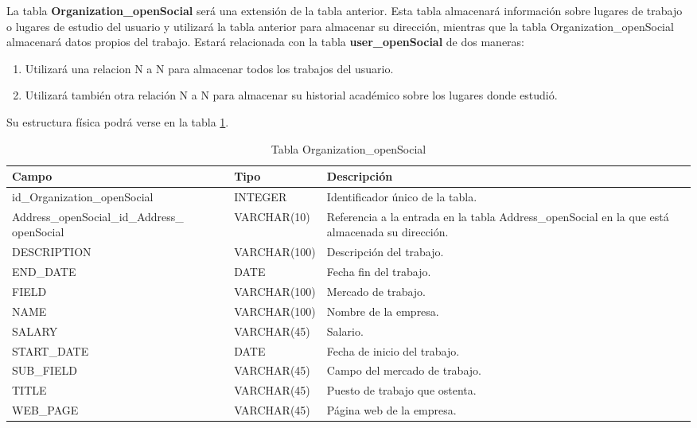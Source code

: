 \bigskip
\par
La tabla \textbf{Organization\_openSocial} será una extensión de la tabla anterior. Esta tabla almacenará información sobre lugares de trabajo o lugares de estudio del usuario y utilizará la tabla anterior para almacenar su dirección, mientras que la tabla Organization\_openSocial almacenará datos propios del trabajo. Estará relacionada con la tabla \textbf{user\_openSocial} de dos maneras:
\begin{enumerate}
\item Utilizará una relacion N a N para almacenar todos los trabajos del usuario.
\item Utilizará también otra relación N a N para almacenar su historial académico sobre los lugares donde estudió.
\end{enumerate}
\bigskip
\par
Su estructura física podrá verse en la tabla \ref{tabOrganizationOpenSocial}.
\bigskip
\par
\begin{table}[h]
\begin{center}
\begin{tabular}{| p{65mm} | l | p{60mm} |}\hline
\textbf{Campo}&\textbf{Tipo}&\textbf{Descripción} \\ \hline
id\_Organization\_openSocial & INTEGER & Identificador único de la tabla. \\ \hline
Address\_openSocial\_id\_Address\_ openSocial & VARCHAR(10) & Referencia a la entrada en la tabla Address\_openSocial en la que está almacenada su dirección. \\ \hline
DESCRIPTION & VARCHAR(100) & Descripción del trabajo. \\ \hline
END\_DATE & DATE &  Fecha fin del trabajo.\\ \hline
FIELD & VARCHAR(100) & Mercado de trabajo. \\ \hline
NAME & VARCHAR(100) &  Nombre de la empresa. \\ \hline
SALARY & VARCHAR(45) &  Salario. \\ \hline
START\_DATE & DATE &  Fecha de inicio del trabajo. \\ \hline
SUB\_FIELD & VARCHAR(45) & Campo del mercado de trabajo. \\ \hline
TITLE & VARCHAR(45) & Puesto de trabajo que ostenta. \\ \hline
WEB\_PAGE & VARCHAR(45) & Página web de la empresa. \\ \hline
\end{tabular}
\end{center}
\caption{Tabla Organization\_openSocial} \label{tabOrganizationOpenSocial}
\end{table}

